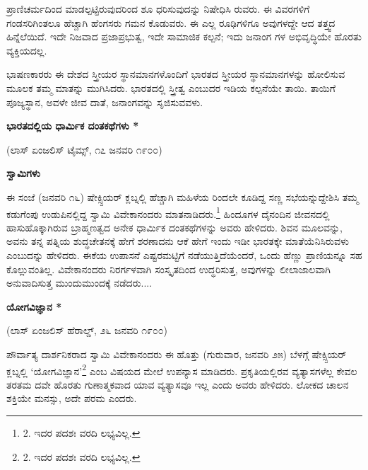 ಪ್ರಾಣಿಚರ್ಮದಿಂದ ಮಾಡಲ್ಪಟ್ಟಿರುವುದರಿಂದ ಶೂ ಧರಿಸುವುದನ್ನು ನಿಷೇಧಿಸಿ ರುವರು. ಈ ವಿವರಗಳಿಗೆ ಗಂಡಸರಿಗಿಂತಲೂ ಹೆಚ್ಚಾಗಿ ಹೆಂಗಸರು ಗಮನ ಕೊಡುವರು. ಈ ಎಲ್ಲ ರೂಢಿಗಳಿಗೂ ಅವುಗಳದ್ದೇ ಆದ ತತ್ತ್ವದ ಹಿನ್ನೆಲೆಯಿದೆ. ಇದೇ ನಿಜವಾದ ಪ್ರಜಾಪ್ರಭುತ್ವ, ಇದೇ ಸಾಮಾಜಿಕ ಕಲ್ಪನೆ; ಇದು ಜನಾಂಗ ಗಳ ಅಭಿವೃದ್ಧಿಯೇ ಹೊರತು ವ್ಯಕ್ತಿಯದಲ್ಲ.

ಭಾಷಣಕಾರರು ಈ ದೇಶದ ಸ್ತ್ರೀಯರ ಸ್ಥಾನಮಾನಗಳೊಂದಿಗೆ ಭಾರತದ ಸ್ತ್ರೀಯರ ಸ್ಥಾನಮಾನಗಳನ್ನು ಹೋಲಿಸುವ ಮೂಲಕ ತಮ್ಮ ಮಾತನ್ನು ಮುಗಿಸಿದರು. ಭಾರತದಲ್ಲಿ ಸ್ತ್ರೀತ್ವ ಎಂಬುದರ ಇಡಿಯ ಕಲ್ಪನೆಯೇ ತಾಯಿ. ತಾಯಿಗೆ ಪೂಜ್ಯಸ್ಥಾನ, ಅವಳೇ ಜೀವ ದಾತೆ, ಜನಾಂಗವನ್ನು ಸೃಜಿಸುವವಳು.

\begin{center}
\textbf{ಭಾರತದಲ್ಲಿಯ ಧಾರ್ಮಿಕ ದಂತಕಥೆಗಳು *}
\end{center}

\begin{center}
(ಲಾಸ್ ಏಂಜಲಿಸ್ ಟೈಮ್ಸ್, ೧೭ ಜನವರಿ ೧೯೦೦)
\end{center}

\begin{center}
\textbf{ಸ್ವಾಮಿಗಳು}
\end{center}

ಈ ಸಂಜೆ (ಜನವರಿ ೧೬) ಷೇಕ್ಸ್ಪಿಯರ್ ಕ್ಲಬ್ನಲ್ಲಿ ಹೆಚ್ಚಾಗಿ ಮಹಿಳೆಯ ರಿಂದಲೇ ಕೂಡಿದ್ದ ಸಣ್ಣ ಸಭೆಯನ್ನುದ್ದೇಶಿಸಿ ತಮ್ಮ ಕಡುಗೆಂಪು ಉಡುಪಿನಲ್ಲಿದ್ದ ಸ್ವಾಮಿ ವಿವೇಕಾನಂದರು ಮಾತನಾಡಿದರು.\footnote{2. ಇದರ ಪದಶಃ ವರದಿ ಲಭ್ಯವಿಲ್ಲ.} ಹಿಂದೂಗಳ ದೈನಂದಿನ ಜೀವನದಲ್ಲಿ ಹಾಸುಹೊಕ್ಕಾಗಿರುವ ಬ್ರಾಹ್ಮಣತ್ವದ ಅನೇಕ ಧಾರ್ಮಿಕ ದಂತಕಥೆಗಳನ್ನು ಅವರು ಹೇಳಿದರು. ಶಿವನ ಮೂಲವನ್ನು, ಅವನು ತನ್ನ ಪತ್ನಿಯ ಶುದ್ಧಚೇತನಕ್ಕೆ ಹೇಗೆ ಶರಣಾದನು ಆಕೆ ಹೇಗೆ ಇಂದು ಇಡೀ ಭಾರತಕ್ಕೇ ಮಾತೆಯೆನಿಸಿರುವಳು ಎಂಬುದನ್ನು ಹೇಳಿದರು. ಈಕೆಯ ಉಪಾಸನೆ ಎಷ್ಟರಮಟ್ಟಿಗೆ ನಡೆಯುತ್ತಿದೆಯೆಂದರೆ, ಒಂದು ಹೆಣ್ಣು ಪ್ರಾಣಿಯನ್ನೂ ಸಹ ಕೊಲ್ಲುವಂತಿಲ್ಲ. ವಿವೇಕಾನಂದರು ನಿರರ್ಗಳವಾಗಿ ಸಂಸ್ಕೃತದಿಂದ ಉದ್ಧರಿಸುತ್ತ, ಅವುಗಳನ್ನು ಲೀಲಾಜಾಲವಾಗಿ ಅನುವಾದಿಸುತ್ತ ಮುಂದುಮುಂದಕ್ಕೆ ನಡೆದರು....

\begin{center}
\textbf{ಯೋಗವಿಜ್ಞಾನ *}
\end{center}

\begin{center}
(ಲಾಸ್ ಏಂಜಲಿಸ್ ಹೆರಾಲ್ಡ್, ೨೬ ಜನವರಿ ೧೯೦೦)
\end{center}

ಪೌರ್ವಾತ್ಯ ದಾರ್ಶನಿಕರಾದ ಸ್ವಾಮಿ ವಿವೇಕಾನಂದರು ಈ ಹೊತ್ತು (ಗುರುವಾರ, ಜನವರಿ ೨೫) ಬೆಳಗ್ಗೆ ಷೇಕ್ಸ್ಪಿಯರ್ ಕ್ಲಬ್ನಲ್ಲಿ ‘ಯೋಗವಿಜ್ಞಾನ’\footnote{2. ಇದರ ಪದಶಃ ವರದಿ ಲಭ್ಯವಿಲ್ಲ.} ಎಂಬ ವಿಷಯದ ಮೇಲೆ ಉಪನ್ಯಾಸ ಮಾಡಿದರು. ಪ್ರಕೃತಿಯಲ್ಲಿರವ ವ್ಯತ್ಯಾಸಗಳೆಲ್ಲ ಕೇವಲ ತರತಮ ದವೇ ಹೊರತು ಗುಣಾತ್ಮಕವಾದ ಯಾವ ವ್ಯತ್ಯಾಸವೂ ಇಲ್ಲ ಎಂದು ಅವರು ಹೇಳಿದರು. ಲೋಕದ ಚಾಲನ ಶಕ್ತಿಯೇ ಮನಸ್ಸು, ಅದೇ ಪರಮ ಎಂದರು.


